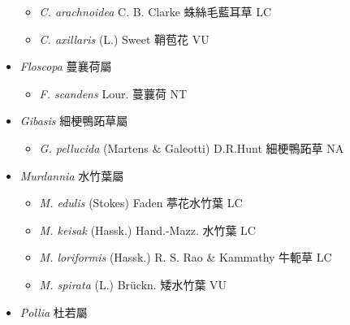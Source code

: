 \begin{itemize}
  \begin{itemize}
        \item[] \textit{C. arachnoidea} C. B. Clarke  蛛絲毛藍耳草   LC
        \item[] \textit{C. axillaris} (L.) Sweet  鞘苞花   VU
  \end{itemize}
 \item[] \textit{Floscopa} 蔓襄荷屬
                                
  \begin{itemize}
        \item[] \textit{F. scandens} Lour.  蔓蘘荷   NT
  \end{itemize}
 \item[] \textit{Gibasis} 細梗鴨跖草屬
                                
  \begin{itemize}
        \item[] \textit{G. pellucida} (Martens \& Galeotti) D.R.Hunt  細梗鴨跖草   NA
  \end{itemize}
 \item[] \textit{Murdannia} 水竹葉屬
                                
  \begin{itemize}
        \item[] \textit{M. edulis} (Stokes) Faden  葶花水竹葉   LC
        \item[] \textit{M. keisak} (Hassk.) Hand.-Mazz.  水竹葉   LC
        \item[] \textit{M. loriformis} (Hassk.) R. S. Rao \& Kammathy  牛軛草   LC
        \item[] \textit{M. spirata} (L.) Brückn.  矮水竹葉   VU
  \end{itemize}
 \item[] \textit{Pollia} 杜若屬
                                

\end{itemize}
